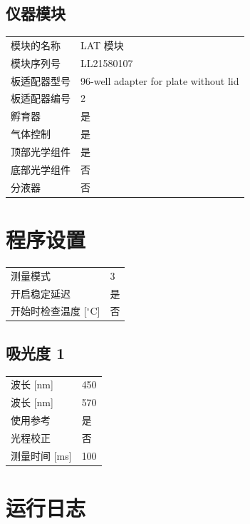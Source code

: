 \documentclass[UTF8,10pt,a4paper,fontset=fandol]{ctexart}
\begin{document}
\subsection{仪器模块}

\begin{tabular}{@{}p{4.5cm}p{8.2cm}@{}}
模块的名称 & LAT 模块 \\
模块序列号 & LL21580107 \\
板适配器型号 & 96-well adapter for plate without lid \\
板适配器编号 & 2 \\
孵育器 & 是 \\
气体控制 & 是 \\
顶部光学组件 & 是 \\
底部光学组件 & 否 \\
分液器 & 否 \\
\end{tabular}

\section{程序设置}

\begin{tabular}{@{}p{5.0cm}p{7.7cm}@{}}
测量模式 & 3 \\
开启稳定延迟 & 是 \\
开始时检查温度 [$^\circ$C] & 否 \\
\end{tabular}

\subsection{吸光度 1}

\begin{tabular}{@{}p{5.0cm}p{7.7cm}@{}}
波长 [nm] & 450 \\
波长 [nm] & 570 \\
使用参考 & 是 \\
光程校正 & 否 \\
测量时间 [ms] & 100 \\
\end{tabular}

\section{运行日志}
\end{document}
